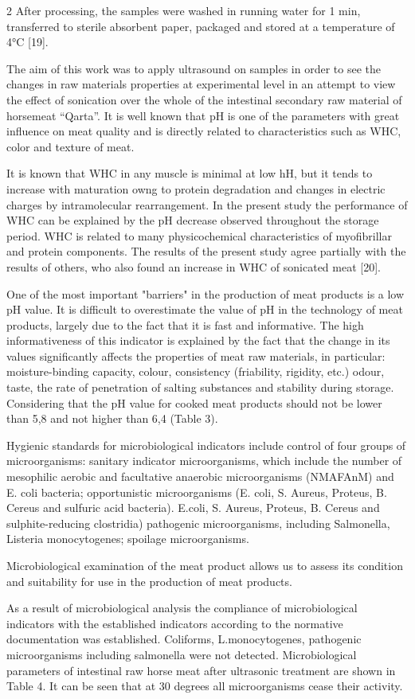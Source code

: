 \begin{multicols}{2}
After processing, the samples were washed in running water for 1 min,
transferred to sterile absorbent paper, packaged and stored at a
temperature of 4°C {[}19{]}.

The aim of this work was to apply ultrasound on samples in order to see
the changes in raw materials properties at experimental level in an
attempt to view the effect of sonication over the whole of the
intestinal secondary raw material of horsemeat ``Qarta''. It is well
known that pH is one of the parameters with great influence on meat
quality and is directly related to characteristics such as WHC, color
and texture of meat.

It is known that WHC in any muscle is minimal at low hH, but it tends to
increase with maturation owng to protein degradation and changes in
electric charges by intramolecular rearrangement. In the present study
the performance of WHC can be explained by the pH decrease observed
throughout the storage period. WHC is related to many physicochemical
characteristics of myofibrillar and protein components. The results of
the present study agree partially with the results of others, who also
found an increase in WHC of sonicated meat {[}20{]}.

One of the most important "barriers" in the production of meat products
is a low pH value. It is difficult to overestimate the value of pH in
the technology of meat products, largely due to the fact that it is fast
and informative. The high informativeness of this indicator is explained
by the fact that the change in its values significantly affects the
properties of meat raw materials, in particular: moisture-binding
capacity, colour, consistency (friability, rigidity, etc.) odour, taste,
the rate of penetration of salting substances and stability during
storage. Considering that the pH value for cooked meat products should
not be lower than 5,8 and not higher than 6,4 (Table 3).

Hygienic standards for microbiological indicators include control of
four groups of microorganisms: sanitary indicator microorganisms, which
include the number of mesophilic aerobic and facultative anaerobic
microorganisms (NMAFAnM) and E. coli bacteria; opportunistic
microorganisms (E. coli, S. Aureus, Proteus, B. Cereus and sulfuric acid
bacteria). E.coli, S. Aureus, Proteus, B. Cereus and sulphite-reducing
clostridia) pathogenic microorganisms, including Salmonella, Listeria
monocytogenes; spoilage microorganisms.

Microbiological examination of the meat product allows us to assess its
condition and suitability for use in the production of meat products.

As a result of microbiological analysis the compliance of
microbiological indicators with the established indicators according to
the normative documentation was established. Coliforms, L.monocytogenes,
pathogenic microorganisms including salmonella were not detected.
Microbiological parameters of intestinal raw horse meat after ultrasonic
treatment are shown in Table 4. It can be seen that at 30 degrees all
microorganisms cease their activity.
\end{multicols}

